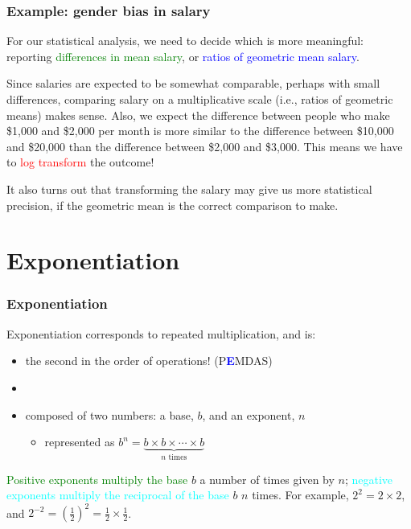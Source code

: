 \documentclass[11pt]{beamer}
\newcommand{\myframe}[1]{\begin{frame} \frametitle{#1}}
\begin{document}
\myframe{Example: gender bias in salary}
For our statistical analysis, we need to decide which is more meaningful: reporting \textcolor{green}{differences in mean salary}, or \textcolor{blue}{ratios of geometric mean salary}.

Since salaries are expected to be somewhat comparable, perhaps with small differences, comparing salary on a multiplicative scale (i.e., ratios of geometric means) makes sense. Also, we expect the difference between people who make \$1,000 and \$2,000 per month is more similar to the difference between \$10,000 and \$20,000 than the difference between \$2,000 and \$3,000. This means we have to \textcolor{red}{log transform} the outcome!

It also turns out that transforming the salary may give us more statistical precision, if the geometric mean is the correct comparison to make.
\end{frame}

\section{Exponentiation}
\myframe{Exponentiation}
Exponentiation corresponds to repeated multiplication, and is:
\begin{itemize}
\item the second in the order of operations! (P\textcolor{blue}{{\textbf E}}MDAS)
\item[]
\item composed of two numbers: a base, $b$, and an exponent, $n$
\begin{itemize}
\item represented as $b^n = \underbrace{b\times b \times \cdots \times b}_\text{$n$ times}$
\end{itemize}
\end{itemize}

\textcolor{green}{Positive exponents multiply the base} $b$ a number of times given by $n$; \textcolor{cyan}{negative exponents multiply the reciprocal of the base} $b$ $n$ times. For example, $2^2 = 2\times 2$, and $2^{-2} = \left(\frac{1}{2}\right)^2 = \frac{1}{2}\times \frac{1}{2}$.
\end{frame}
\end{document}
